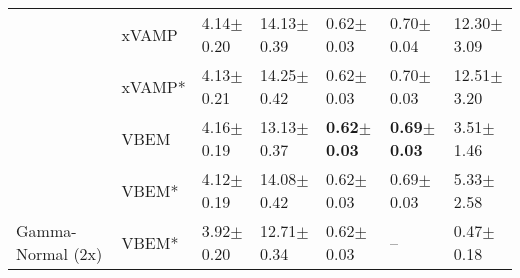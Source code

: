 \begin{tabular}{lllllll}
                  & xVAMP &           4.14$\pm$0.20 &           14.13$\pm$0.39 &           0.62$\pm$0.03 &           0.70$\pm$0.04 &          12.30$\pm$3.09 \\
                  & xVAMP* &           4.13$\pm$0.21 &           14.25$\pm$0.42 &           0.62$\pm$0.03 &           0.70$\pm$0.03 &          12.51$\pm$3.20 \\
                  & VBEM &           4.16$\pm$0.19 &           13.13$\pm$0.37 &  \textbf{0.62$\pm$0.03} &  \textbf{0.69$\pm$0.03} &           3.51$\pm$1.46 \\
                  & VBEM* &           4.12$\pm$0.19 &           14.08$\pm$0.42 &           0.62$\pm$0.03 &           0.69$\pm$0.03 &           5.33$\pm$2.58 \\
Gamma-Normal (2x) & VBEM* &           3.92$\pm$0.20 &           12.71$\pm$0.34 &           0.62$\pm$0.03 &                     -- &           0.47$\pm$0.18 \\
\bottomrule
\end{tabular}

